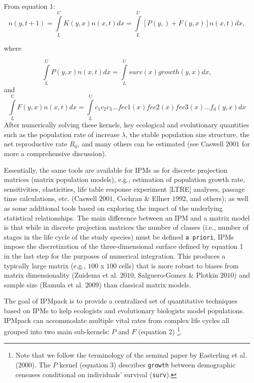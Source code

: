 \documentclass{article}
\begin{document}
From equation 1: 
\begin{equation}
n(y, t+1) = \int\limits_{L}^{U} K(y, x) n(x, t) dx = \int\limits_{L}^{U}
[P(y, ) + F(y, x)] n(x, t) dx ,
\end{equation}

where

\begin{equation}
 \int\limits_{L}^{U} P(y, x) n(x, t) dx = \int\limits_{L}^{U}surv(x)growth(y, x)dx ,    
\end{equation}
and
\begin{equation}
 \int\limits_{L}^{U} F(y, x) n(x, t) dx = \int\limits_{L}^{U}
c_1 c_2 c_3 ... fec1(x)fec2(x)fec3(x)...f_d(y, x)dx     
\end{equation}
After numerically solving these kernels, key ecological and evolutionary quantities such as the population rate of increase $\lambda$, the stable population size structure, the net reproductive rate $R_0$, and many others can be estimated (see Caswell $2001$ for more a comprehensive discussion). 

Essentially, the same tools are available for IPMs as for discrete projection
matrices (matrix population models), e.g., estimation of population
growth rate, sensitivities, elasticities, life table response
experiment [LTRE] analyses, passage time calculations, etc. (Caswell
$2001$, Cochran \& Ellner $1992$, and others); as well as some
additional tools based on exploring the impact of the underlying
statistical relationships. The main difference
between an IPM and a matrix model is that while in discrete projection
matrices the number of classes (i.e., number of stages in the life
cycle of the study species) must be defined {\tt a priori}, IPMs
impose the discretization of the three-dimensional surface defined by
equation 1 in the last step for the purposes of numerical integration. This produces a typically large matrix (e.g., $100$ x $100$ cells) that is more robust to biases from matrix dimensionality (Zuidema et al. $2010$, Salguero-Gomez \& Plotkin $2010$) and sample size (Ramula et al. $2009$) than classical matrix models.

The goal of IPMpack is to provide a centralized set of quantitative techniques based on IPMs to help ecologists and evolutionary biologists model populations. IPMpack can accommodate multiple vital rates from complex life cycles all grouped into two main sub-kernels: $P$ and $F$ (equation 2) \footnote{Note that we follow the terminology of the seminal paper by Easterling et al. ($2000$). The $P$ kernel (equation 3) describes {\tt growth} between demographic censuses conditional on individuals' survival ({\tt surv}).
}.
\end{document}
